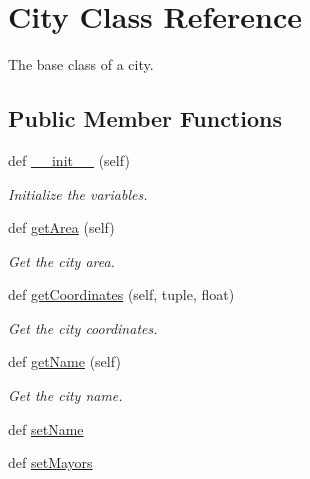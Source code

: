 \hypertarget{classpipver_1_1helloworld_1_1City}{}\section{City Class Reference}
\label{classpipver_1_1helloworld_1_1City}


The base class of a city.  


\subsection*{Public Member Functions}
\begin{DoxyCompactItemize}
\item 
def \hyperlink{classpipver_1_1helloworld_1_1City_ae64f0875afe3067b97ba370b354b9213}{\+\_\+\+\_\+init\+\_\+\+\_\+} (self)
\begin{DoxyCompactList}\small\item\em Initialize the variables. \end{DoxyCompactList}\item 
def \hyperlink{classpipver_1_1helloworld_1_1City_a46ebd66915fe42e9e8868b509f99800d}{get\+Area} (self)
\begin{DoxyCompactList}\small\item\em Get the city area. \end{DoxyCompactList}\item 
def \hyperlink{classpipver_1_1helloworld_1_1City_a7242f24d1b53efef369d36a6e5e22923}{get\+Coordinates} (self, tuple, float)
\begin{DoxyCompactList}\small\item\em Get the city coordinates. \end{DoxyCompactList}\item 
def \hyperlink{classpipver_1_1helloworld_1_1City_a91720e5fd3a7e677f314a4b26451b864}{get\+Name} (self)
\begin{DoxyCompactList}\small\item\em Get the city name. \end{DoxyCompactList}\item 
def \hyperlink{classpipver_1_1helloworld_1_1City_a7353c2f35c0cfe24ff85fdeb1a6d1835}{set\+Name}
\item 
def \hyperlink{classpipver_1_1helloworld_1_1City_ab91dd59a138196360a74260bae9dd74b}{set\+Mayors}
\end{DoxyCompactItemize}
